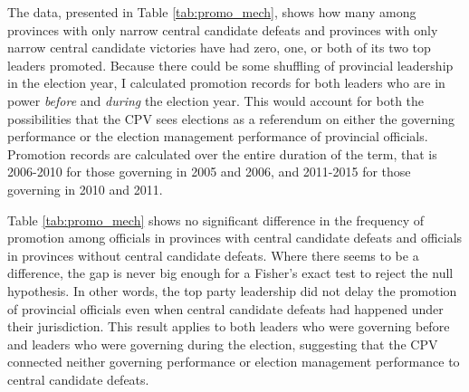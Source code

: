 \documentclass[12pt]{article}
\newcommand{\1}{\mathbbm{1}}
\begin{document}
The data, presented in Table \ref{tab:promo_mech}, shows how many among provinces with only narrow central candidate defeats and provinces with only narrow central candidate victories have had zero, one, or both of its two top leaders promoted. Because there could be some shuffling of provincial leadership in the election year, I calculated promotion records for both leaders who are in power \textit{before} and \textit{during} the election year. This would account for both the possibilities that the CPV sees elections as a referendum on either the governing performance or the election management performance of provincial officials. Promotion records are calculated over the entire duration of the term, that is 2006-2010 for those governing in 2005 and 2006, and 2011-2015 for those governing in 2010 and 2011.



Table \ref{tab:promo_mech} shows no significant difference in the frequency of promotion among officials in provinces with central candidate defeats and officials in provinces without central candidate defeats. Where there seems to be a difference, the gap is never big enough for a Fisher's exact test to reject the null hypothesis. In other words, the top party leadership did not delay the promotion of provincial officials even when central candidate defeats had happened under their jurisdiction. This result applies to both leaders who were governing before and leaders who were governing during the election, suggesting that the CPV connected neither governing performance or election management performance to central candidate defeats. 
\end{document}
